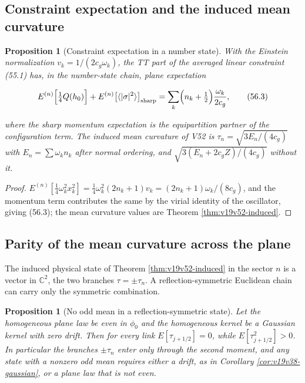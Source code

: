 \documentclass[11pt]{article}
\newtheorem{proposition}[theorem]{Proposition}
\theoremstyle{remark}
\begin{document}
\subsection{Constraint expectation and the induced mean curvature}

\begin{proposition}[Constraint expectation in a number state]
\label{prop:v19v53-constraint}
With the Einstein normalization \(v_k=1/(2c_g\omega_k)\), the TT part of
the averaged linear constraint (55.1) has, in the number-state chain,
plane expectation

\[
 E^{(n)}\Bigl[\tfrac14Q(h_0)\Bigr]+E^{(n)}\bigl[\langle|\sigma|^2\rangle\bigr]_{\rm sharp}
 =\sum_k\Bigl(n_k+\tfrac12\Bigr)\frac{\omega_k}{2c_g},                 \tag{56.3}
\]

where the sharp momentum expectation is the equipartition partner of
the configuration term.  The induced mean curvature of V52 is
\(\tau_n=\sqrt{3E_n/(4c_g)}\) with \(E_n=\sum\omega_kn_k\) after normal
ordering, and \(\sqrt{3(E_n+2c_gZ)/(4c_g)}\) without it.
\end{proposition}

\begin{proof}
\(E^{(n)}[\tfrac14\omega_k^2x_k^2]=\tfrac14\omega_k^2(2n_k+1)v_k
=(2n_k+1)\omega_k/(8c_g)\), and the momentum term contributes the same
by the virial identity of the oscillator, giving (56.3); the mean
curvature values are Theorem \ref{thm:v19v52-induced}.
\end{proof}

\subsection{Parity of the mean curvature across the plane}

The induced physical state of Theorem \ref{thm:v19v52-induced} in the
sector \(n\) is a vector in \(\mathbb C^2\), the two branches
\(\tau=\pm\tau_n\).  A reflection-symmetric Euclidean chain can carry
only the symmetric combination.

\begin{proposition}[No odd mean in a reflection-symmetric state]
\label{prop:v19v53-parity}
Let the homogeneous plane law be even in \(\phi_0\) and the homogeneous
kernel be a Gaussian kernel with zero drift.  Then for every link
\(E[\tau_{j+1/2}]=0\), while \(E[\tau_{j+1/2}^2]>0\).  In particular the
branches \(\pm\tau_n\) enter only through the second moment, and any
state with a nonzero odd mean requires either a drift, as in
Corollary \ref{cor:v19v38-gaussian}, or a plane law that is not even.
\end{proposition}
\end{document}

